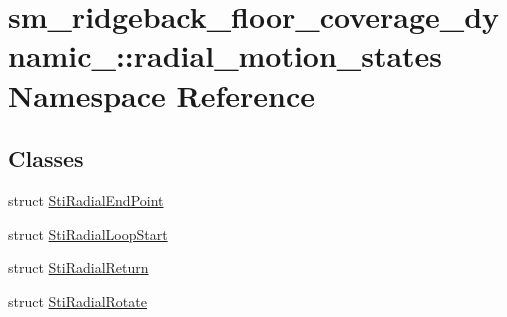 \hypertarget{namespacesm__ridgeback__floor__coverage__dynamic__1_1_1radial__motion__states}{}\section{sm\+\_\+ridgeback\+\_\+floor\+\_\+coverage\+\_\+dynamic\+\_\+:\+:radial\+\_\+motion\+\_\+states Namespace Reference}
\label{namespacesm__ridgeback__floor__coverage__dynamic__1_1_1radial__motion__states}
\subsection*{Classes}
\begin{DoxyCompactItemize}
\item 
struct \hyperlink{structsm__ridgeback__floor__coverage__dynamic__1_1_1radial__motion__states_1_1StiRadialEndPoint}{Sti\+Radial\+End\+Point}
\item 
struct \hyperlink{structsm__ridgeback__floor__coverage__dynamic__1_1_1radial__motion__states_1_1StiRadialLoopStart}{Sti\+Radial\+Loop\+Start}
\item 
struct \hyperlink{structsm__ridgeback__floor__coverage__dynamic__1_1_1radial__motion__states_1_1StiRadialReturn}{Sti\+Radial\+Return}
\item 
struct \hyperlink{structsm__ridgeback__floor__coverage__dynamic__1_1_1radial__motion__states_1_1StiRadialRotate}{Sti\+Radial\+Rotate}
\end{DoxyCompactItemize}
